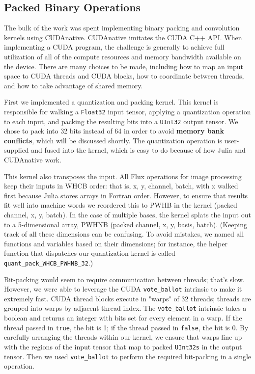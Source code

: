 \documentclass[12pt]{article}
\begin{document}
\subsection{Packed Binary Operations}
\label{sec:org83ca12c}

The bulk of the work was spent implementing binary packing and convolution kernels using CUDAnative. CUDAnative imitates the CUDA C++ API. When implementing a CUDA program, the challenge is generally to achieve full utilization of all of the compute resources and memory bandwidth available on the device. There are many choices to be made, including how to map an input space to CUDA threads and CUDA blocks, how to coordinate between threads, and how to take advantage of shared memory.

First we implemented a quantization and packing kernel. This kernel is responsible for walking a \texttt{Float32} input tensor, applying a quantization operation to each input, and packing the resulting bits into a \texttt{UInt32} output tensor. We chose to pack into 32 bits instead of 64 in order to avoid \textbf{memory bank conflicts}, which will be discussed shortly. The quantization operation is user-supplied and fused into the kernel, which is easy to do because of how Julia and CUDAnative work.

This kernel also transposes the input.
All Flux operations for image processing keep their inputs in WHCB order: that is, x, y, channel, batch, with x walked first because Julia stores arrays in Fortran order. However, to ensure that results fit well into machine words we reordered this to PWHB in the kernel (packed channel, x, y, batch). In the case of multiple bases, the kernel splats the input out to a 5-dimensional array, PWHNB (packed channel, x, y, basis, batch).
(Keeping track of all these dimensions can be confusing. To avoid mistakes, we named all functions and variables based on their dimensions; for instance, the helper function that dispatches our quantization kernel is called \texttt{quant\_pack\_WHCB\_PWHNB\_32}.)

Bit-packing would seem to require communication between threads; that's slow. However, we were able to leverage the CUDA \texttt{vote\_ballot} intrinsic to make it extremely fast. CUDA thread blocks execute in "warps" of 32 threads; threads are grouped into warps by adjacent thread index.
The \texttt{vote\_ballot} intrinsic takes a boolean and returns an integer with bits set for every element in a warp. If the thread passed in \texttt{true}, the bit is 1; if the thread passed in \texttt{false}, the bit is 0. By carefully arranging the threads within our kernel, we ensure that warps line up with the regions of the input tensor that map to packed \texttt{UInt32s} in the output tensor. Then we used \texttt{vote\_ballot} to perform the required bit-packing in a single operation.
\end{document}
